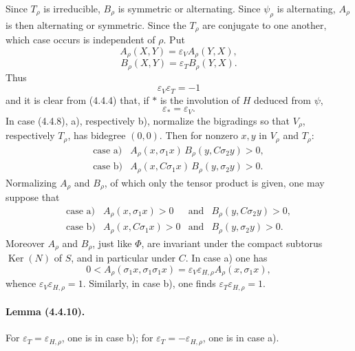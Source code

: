 \documentclass[10pt]{article}
\newcommand{\Ker}{\operatorname{Ker}}
\begin{document}
Since $T_\rho$ is irreducible, $B_\rho$ is symmetric or alternating. Since $\psi_\rho$ is alternating, $A_\rho$ is then alternating or symmetric. Since the $T_\rho$ are conjugate to one another, which case occurs is independent of $\rho$. Put
\[
\tag{4.4.9.4}
A_\rho(X,Y)=\varepsilon_V A_\rho(Y,X),
\]
\[
\tag{4.4.9.5}
B_\rho(X,Y)=\varepsilon_T B_\rho(Y,X).
\]
Thus
\[
\tag{4.4.9.6}
\varepsilon_V\varepsilon_T=-1
\]
and it is clear from (4.4.4) that, if $*$ is the involution of $H$ deduced from $\psi$,
\[
\tag{4.4.9.7}
\varepsilon_*=\varepsilon_V.
\]
In case (4.4.8), a), respectively b), normalize the bigradings so that $V_\rho$, respectively $T_\rho$, has bidegree $(0,0)$. Then for nonzero $x,y$ in $V_\rho$ and $T_\rho$:
\[
\begin{array}{ll}
\text{case a)}& A_\rho(x,\sigma_1x)\,B_\rho(y,C\sigma_2y)>0,\\[0.3em]
\text{case b)}& A_\rho(x,C\sigma_1x)\,B_\rho(y,\sigma_2y)>0.
\end{array}
\]
Normalizing $A_\rho$ and $B_\rho$, of which only the tensor product is given, one may suppose that
\[
\begin{array}{llll}
\text{case a)}& A_\rho(x,\sigma_1x)>0 & \text{and} & B_\rho(y,C\sigma_2y)>0,\\[0.3em]
\text{case b)}& A_\rho(x,C\sigma_1x)>0 & \text{and} & B_\rho(y,\sigma_2y)>0.
\end{array}
\]
Moreover $A_\rho$ and $B_\rho$, just like $\Phi$, are invariant under the compact subtorus $\Ker(N)$ of $S$, and in particular under $C$. In case a) one has
\[
0<A_\rho(\sigma_1x,\sigma_1\sigma_1x)
=\varepsilon_V\varepsilon_{H,\rho}A_\rho(x,\sigma_1x),
\]
whence $\varepsilon_V\varepsilon_{H,\rho}=1$. Similarly, in case b), one finds $\varepsilon_T\varepsilon_{H,\rho}=1$.

\paragraph{Lemma (4.4.10).} For $\varepsilon_T=\varepsilon_{H,\rho}$, one is in case b); for $\varepsilon_T=-\varepsilon_{H,\rho}$, one is in case a).
\end{document}
